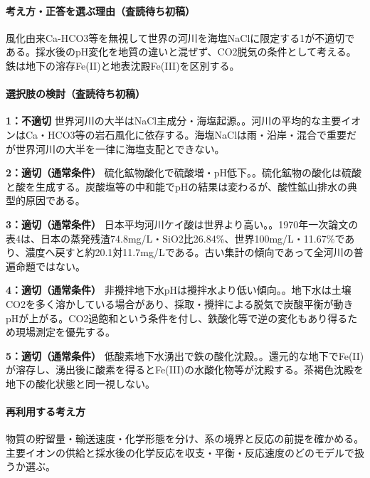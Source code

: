 \paragraph{考え方・正答を選ぶ理由（査読待ち初稿）} 風化由来Ca-HCO3等を無視して世界の河川を海塩NaClに限定する1が不適切である。採水後のpH変化を地質の違いと混ぜず、CO2脱気の条件として考える。鉄は地下の溶存Fe(II)と地表沈殿Fe(III)を区別する。

\paragraph{選択肢の検討（査読待ち初稿）}\mbox{}\par

\noindent\textbf{1：不適切} 世界河川の大半はNaCl主成分・海塩起源。。河川の平均的な主要イオンはCa・HCO3等の岩石風化に依存する。海塩NaClは雨・沿岸・混合で重要だが世界河川の大半を一律に海塩支配とできない。\par

\noindent\textbf{2：適切（通常条件）} 硫化鉱物酸化で硫酸増・pH低下。。硫化鉱物の酸化は硫酸と酸を生成する。炭酸塩等の中和能でpHの結果は変わるが、酸性鉱山排水の典型的原因である。\par

\noindent\textbf{3：適切（通常条件）} 日本平均河川ケイ酸は世界より高い。。1970年一次論文の表4は、日本の蒸発残渣74.8mg/L・SiO2比26.84\%、世界100mg/L・11.67\%であり、濃度へ戻すと約20.1対11.7mg/Lである。古い集計の傾向であって全河川の普遍命題ではない。\par

\noindent\textbf{4：適切（通常条件）} 非攪拌地下水pHは攪拌水より低い傾向。。地下水は土壌CO2を多く溶かしている場合があり、採取・攪拌による脱気で炭酸平衡が動きpHが上がる。CO2過飽和という条件を付し、鉄酸化等で逆の変化もあり得るため現場測定を優先する。\par

\noindent\textbf{5：適切（通常条件）} 低酸素地下水湧出で鉄の酸化沈殿。。還元的な地下でFe(II)が溶存し、湧出後に酸素を得るとFe(III)の水酸化物等が沈殿する。茶褐色沈殿を地下の酸化状態と同一視しない。\par

\paragraph{再利用する考え方} 物質の貯留量・輸送速度・化学形態を分け、系の境界と反応の前提を確かめる。主要イオンの供給と採水後の化学反応を収支・平衡・反応速度のどのモデルで扱うか選ぶ。

